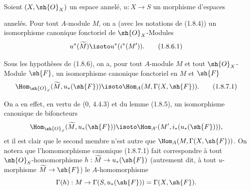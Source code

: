 \begin{corollary}[1.8.6]
\label{ega2:addendum:I.1.8.6-fr}
Soient $(X,\sh{O}_X)$ un espace annelé, $u:X\to S$ un morphisme
d'espaces
annelés. Pour tout $A$-module $M$, on a (avec les notations de (1.8.4)) un
isomorphisme canonique fonctoriel de $\sh{O}_X$-Modules
\begin{equation}
\label{ega2:addendum:I.1.8.6.1-fr}
  u^*(\widetilde M)\isoto u^*(i^*(M')).
\tag{1.8.6.1}
\end{equation}
\end{corollary}

\begin{corollary}[1.8.7]
\label{ega2:addendum:I.1.8.7-fr}
Sous les hypothèses de (1.8.6), on a, pour tout $A$-module $M$ et tout
$\sh{O}_X$-Module $\sh{F}$, un isomorphisme canonique fonctoriel en
$M$ et $\sh{F}$
\begin{equation}
\label{ega2:addendum:I.1.8.7.1-fr}
  \Hom_{\sh{O}_S}(\widetilde M,u_*(\sh{F}))
  \isoto\Hom_A(M,\Gamma(X,\sh{F})).
\tag{1.8.7.1}
\end{equation}
\end{corollary}

On a en effet, en vertu de (0, 4.4.3) et du lemme (1.8.5), un
isomorphisme canonique de bifoncteurs
\[
  \Hom_{\sh{O}_S}(\widetilde M,u_*(\sh{F}))
  \isoto\Hom_{A'}(M',i_*(u_*(\sh{F}))),
\]
et il est clair que le second membre n'est autre que
$\Hom_A(M,\Gamma(X,\sh{F}))$. On notera que l'homomorphisme canonique
(1.8.7.1) fait correspondre à tout $\sh{O}_S$-homomorphisme
$h:\widetilde M\to u_*(\sh{F})$ (autrement dit, à tout $u$-morphisme
$\widetilde M\to\sh{F}$) le $A$-homomorphisme
\[
  \Gamma(h):M\to\Gamma(S,u_*(\sh{F}))=\Gamma(X,\sh{F}).
\]

